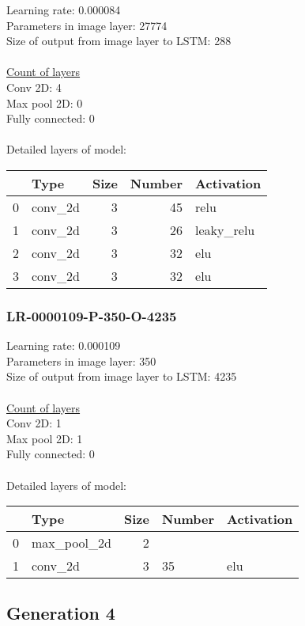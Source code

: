 Learning rate: 0.000084
\\Parameters in image layer: 27774
\\Size of output from image layer to LSTM: 288
\\\\\underline{Count of layers} 
\\Conv 2D:           4\\Max pool 2D:      0\\Fully connected:  0
\\\\Detailed layers of model: \\\begin{tabular}{rlrrl}
\hline
    & Type    &   Size &   Number & Activation   \\
\hline
  0 & conv\_2d &      3 &       45 & relu         \\
  1 & conv\_2d &      3 &       26 & leaky\_relu   \\
  2 & conv\_2d &      3 &       32 & elu          \\
  3 & conv\_2d &      3 &       32 & elu          \\
\hline
\end{tabular}\subsubsection*{LR-0000109-P-350-O-4235}
Learning rate: 0.000109
\\Parameters in image layer: 350
\\Size of output from image layer to LSTM: 4235
\\\\\underline{Count of layers} 
\\Conv 2D:           1\\Max pool 2D:      1\\Fully connected:  0
\\\\Detailed layers of model: \\\begin{tabular}{rlrll}
\hline
    & Type        &   Size & Number   & Activation   \\
\hline
  0 & max\_pool\_2d &      2 &          &              \\
  1 & conv\_2d     &      3 & 35       & elu          \\
\hline
\end{tabular}\subsection{Generation 4}
